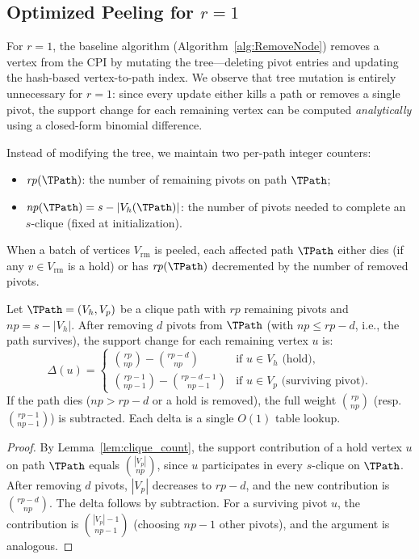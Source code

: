 
\subsection{Optimized Peeling for $r=1$}
\label{sec:opt_r1}

For $r=1$, the baseline algorithm (Algorithm~\ref{alg:RemoveNode}) removes a vertex from the CPI by mutating the tree---deleting pivot entries and updating the hash-based vertex-to-path index.
We observe that tree mutation is entirely unnecessary for $r=1$: since every update either kills a path or removes a single pivot, the support change for each remaining vertex can be computed \emph{analytically} using a closed-form binomial difference.

Instead of modifying the tree, we maintain two per-path integer counters:
\begin{itemize}[leftmargin=*]
\item $\mathit{rp}(\TPath)$: the number of remaining pivots on path $\TPath$;
\item $\mathit{np}(\TPath) = s - |V_h(\TPath)|$: the number of pivots needed to complete an $s$-clique (fixed at initialization).
\end{itemize}
When a batch of vertices $V_{\mathrm{rm}}$ is peeled, each affected path $\TPath$ either dies (if any $v \in V_{\mathrm{rm}}$ is a hold) or has $\mathit{rp}(\TPath)$ decremented by the number of removed pivots.

\begin{theorem}[Closed-Form Support Delta for $r=1$]\label{thm:r1_delta}
Let $\TPath = (V_h, V_p)$ be a clique path with $\mathit{rp}$ remaining pivots and $\mathit{np} = s - |V_h|$.
After removing $d$ pivots from $\TPath$ (with $\mathit{np} \le \mathit{rp} - d$, i.e., the path survives), the support change for each remaining vertex $u$ is:
\[
\Delta(u) =
\begin{cases}
\binom{\mathit{rp}}{np} - \binom{\mathit{rp}-d}{np} & \text{if } u \in V_h \text{ (hold)}, \\[4pt]
\binom{\mathit{rp}-1}{np-1} - \binom{\mathit{rp}-d-1}{np-1} & \text{if } u \in V_p \text{ (surviving pivot)}.
\end{cases}
\]
If the path dies ($\mathit{np} > \mathit{rp} - d$ or a hold is removed), the full weight $\binom{\mathit{rp}}{np}$ (resp.\ $\binom{\mathit{rp}-1}{np-1}$) is subtracted.
Each delta is a single $O(1)$ table lookup.
\end{theorem}

\begin{proof}
By Lemma~\ref{lem:clique_count}, the support contribution of a hold vertex $u$ on path $\TPath$ equals $\binom{|V_p|}{np}$, since $u$ participates in every $s$-clique on $\TPath$.
After removing $d$ pivots, $|V_p|$ decreases to $\mathit{rp} - d$, and the new contribution is $\binom{\mathit{rp}-d}{np}$.
The delta follows by subtraction.
For a surviving pivot $u$, the contribution is $\binom{|V_p|-1}{np-1}$ (choosing $np-1$ other pivots), and the argument is analogous.
\end{proof}

